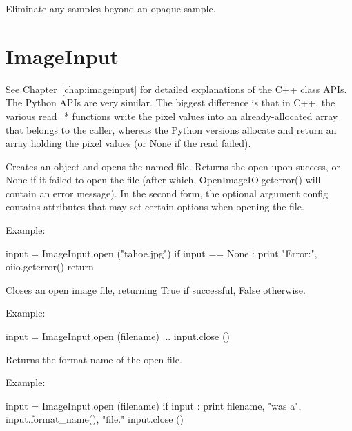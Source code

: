 Eliminate any samples beyond an opaque sample.
\apiend



\section{ImageInput}
\label{sec:pythonimageinput}

See Chapter~\ref{chap:imageinput} for detailed explanations of the
C++ \ImageInput class APIs. The Python APIs are very similar. The biggest
difference is that in C++, the various {\cf read_*} functions write the
pixel values into an already-allocated array that belongs to the caller,
whereas the Python versions allocate and return an array holding the pixel
values (or {\cf None} if the read failed).


Creates an \ImageInput object and opens the named file.  Returns the
open \ImageInput upon success, or {\cf None} if it failed to open the
file (after which, {\cf OpenImageIO.geterror()} will contain an error
message).  In the second form, the optional \ImageSpec argument 
{\cf config} contains attributes that may set certain options when opening
the file.

\noindent Example:
\begin{code}
    input = ImageInput.open ("tahoe.jpg")
    if input == None :
        print "Error:", oiio.geterror()
        return
\end{code}
\apiend

Closes an open image file, returning {\cf True} if successful, {\cf False}
otherwise.

\noindent Example:
\begin{code}
    input = ImageInput.open (filename)
    ...
    input.close ()
\end{code}
\apiend


Returns the format name of the open file.

\noindent Example:
\begin{code}
    input = ImageInput.open (filename)
    if input :
        print filename, "was a", input.format_name(), "file."
        input.close ()
  
\end{code}
\apiend

